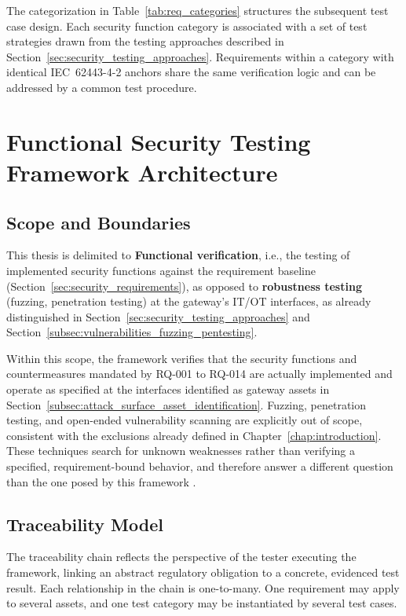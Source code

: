 The categorization in Table~\ref{tab:req_categories} structures the subsequent test case design. Each security function category is associated with a set of test strategies drawn from the testing approaches described in Section~\ref{sec:security_testing_approaches}. Requirements within a category with identical IEC~62443-4-2 anchors share the same verification logic and can be addressed by a common test procedure.



\section{Functional Security Testing Framework Architecture}
\label{sec:framework_architecture}

\subsection{Scope and Boundaries}
\label{subsec:scope_boundaries}

This thesis is delimited to \textbf{Functional verification}, i.e., the testing of implemented security functions against the requirement baseline (Section~\ref{sec:security_requirements}), as opposed to \textbf{robustness testing} (fuzzing, penetration testing) at the gateway's IT/OT interfaces, as already distinguished in Section~\ref{sec:security_testing_approaches} and Section~\ref{subsec:vulnerabilities_fuzzing_pentesting}.

Within this scope, the framework verifies that the security functions and countermeasures mandated by RQ-001 to RQ-014 are actually implemented and operate as specified at the interfaces identified as gateway assets in Section~\ref{subsec:attack_surface_asset_identification}. Fuzzing, penetration testing, and open-ended vulnerability scanning are explicitly out of scope, consistent with the exclusions already defined in Chapter~\ref{chap:introduction}. These techniques search for unknown weaknesses rather than verifying a specified, requirement-bound behavior, and therefore answer a different question than the one posed by this framework \cite[p.8, pp. 29]{richier2011security}.


\subsection{Traceability Model}
\label{subsec:traceability_model}

The traceability chain reflects the perspective of the tester executing the framework, linking an abstract regulatory obligation to a concrete, evidenced test result. Each relationship in the chain is one-to-many. One requirement may apply to several assets, and one test category may be instantiated by several test cases.

